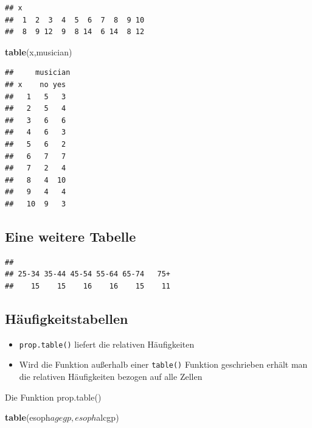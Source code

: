 \documentclass[]{article}
\newenvironment{Shaded}{\begin{snugshade}}{\end{snugshade}}
\newcommand{\KeywordTok}[1]{\textcolor[rgb]{0.13,0.29,0.53}{\textbf{{#1}}}}
\newcommand{\NormalTok}[1]{{#1}}
\providecommand{\tightlist}{%
  \setlength{\itemsep}{0pt}\setlength{\parskip}{0pt}}
\begin{document}
\begin{verbatim}
## x
##  1  2  3  4  5  6  7  8  9 10 
##  8  9 12  9  8 14  6 14  8 12
\end{verbatim}

\begin{Shaded}
\begin{Highlighting}[]
\KeywordTok{table}\NormalTok{(x,musician)}
\end{Highlighting}
\end{Shaded}

\begin{verbatim}
##     musician
## x    no yes
##   1   5   3
##   2   5   4
##   3   6   6
##   4   6   3
##   5   6   2
##   6   7   7
##   7   2   4
##   8   4  10
##   9   4   4
##   10  9   3
\end{verbatim}

\subsection{Eine weitere Tabelle}\label{eine-weitere-tabelle}

\begin{Shaded}
\end{Shaded}

\begin{verbatim}
## 
## 25-34 35-44 45-54 55-64 65-74   75+ 
##    15    15    16    16    15    11
\end{verbatim}

\subsection{Häufigkeitstabellen}\label{haufigkeitstabellen}

\begin{itemize}
\tightlist
\item
  \texttt{prop.table()} liefert die relativen Häufigkeiten
\item
  Wird die Funktion außerhalb einer \texttt{table()} Funktion
  geschrieben erhält man die relativen Häufigkeiten bezogen auf alle
  Zellen
\end{itemize}

Die Funktion prop.table()

\begin{Shaded}
\begin{Highlighting}[]
\KeywordTok{table}\NormalTok{(esoph$agegp,esoph$alcgp)}
\end{Highlighting}
\end{Shaded}
\end{document}
